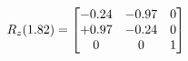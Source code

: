 \documentclass[preview]{standalone}
\begin{document}
\begin{align*}
\special{dvisvgm:raw <g id='unique000'>}R_{z}(1.82) = \begin{bmatrix}-0.24 & -0.97 & 0 \\+0.97 & -0.24 & 0 \\0 & 0 & 1\end{bmatrix}\special{dvisvgm:raw </g>}
\end{align*}
\end{document}
